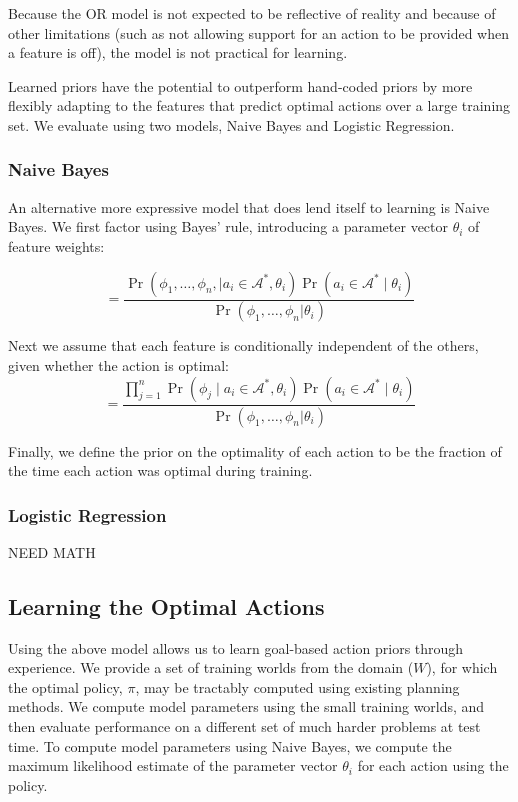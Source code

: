 \documentclass[11pt]{article}
\begin{document}
Because the OR model is not expected to be reflective of
reality and because of other limitations (such as not allowing support
for an action to be provided when a feature is off), the model is not
practical for learning.

Learned priors have the potential to outperform
hand-coded priors by more flexibly adapting to the
features that predict optimal actions over a large training set.
We evaluate using two models, Naive Bayes and Logistic Regression.

\subsubsection{Naive Bayes}
An alternative more expressive model that does lend itself to learning is
Naive Bayes. We first factor using Bayes' rule, introducing a parameter vector $\theta_i$ of
feature weights:

\begin{equation}
= \frac{\Pr(\phi_1, \ldots, \phi_{n}, \mid a_i \in \mathcal{A}^*, \theta_i) \Pr(a_i \in \mathcal{A}^* \mid \theta_i)}{\Pr(\phi_1, \ldots, \phi_{n} | \theta_i)}
\label{eq:bayes}
\end{equation}

Next we assume that each feature is conditionally independent of the others, given whether the action is optimal:
\begin{equation}
= \frac{\prod_{j=1}^{n} \Pr(\phi_j \mid a_i \in \mathcal{A}^*, \theta_i) \Pr(a_i \in \mathcal{A}^* \mid \theta_i) }{\Pr(\phi_1, \ldots, \phi_{n} | \theta_i)}
\label{eq:final}
\end{equation}

Finally, we define the prior on the optimality of each action to be
the fraction of the time each action was optimal during training.


\subsubsection{Logistic Regression}

NEED MATH


\subsection{Learning the Optimal Actions}
Using the above model allows us to learn goal-based action priors
through experience. We provide a set of
training worlds from the domain ($W$), for which the optimal policy,
$\pi$, may be tractably computed using existing planning methods.  We
compute model parameters using the small training worlds, and then
evaluate performance on a different set of much harder problems at
test time.  To compute model parameters using Naive Bayes, we compute
the maximum likelihood estimate of the parameter vector $\theta_i$ for
each action using the policy.
\end{document}
